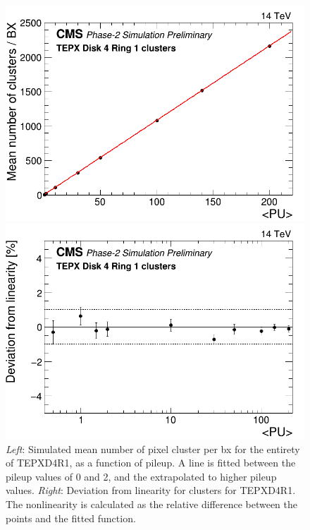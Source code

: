\begin{center}
    \begin{figure}[H]
\begin{minipage}[b]{0.5\linewidth}
        \centering
        \includegraphics[scale=0.25]{Chapter4/plots/TEPX_Disk_4_Ring_1_mean_number_of_clusters___bx_Linearity.png}
\end{minipage}
\begin{minipage}[b]{0.5\linewidth}
        \centering
        \includegraphics[scale=0.25]{Chapter4/plots/TEPX_Disk_4_Ring_1_mean_number_of_clusters___bx_Linearity_residuals.png}
\end{minipage}
    \caption[Linearity of TEPXD4R1 for pixel clusters.]{\textit{Left}: Simulated mean number of pixel cluster per bx for the entirety of TEPXD4R1, as a function of pileup. A line is fitted between the pileup values of 0 and 2, and the extrapolated to higher pileup values. \textit{Right}: Deviation from linearity for clusters for TEPXD4R1. The nonlinearity is calculated as the relative difference between the points and the fitted function.}
    \label{lin2}
\end{figure}
\end{center}


